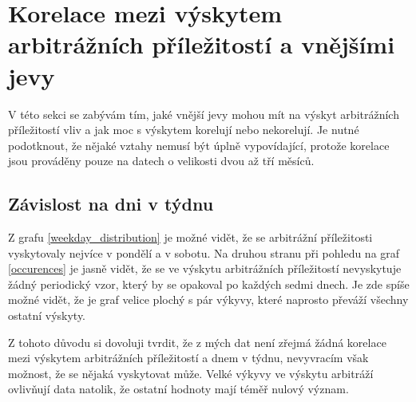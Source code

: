 \documentclass[thesis=B,czech]{FITthesis}[2019/03/21]
\begin{document}
\section{Korelace mezi výskytem arbitrážních příležitostí a vnějšími jevy}
V této sekci se zabývám tím, jaké vnější jevy mohou mít na výskyt arbitrážních příležitostí vliv a jak moc s výskytem korelují nebo nekorelují. Je nutné podotknout, že nějaké vztahy nemusí být úplně vypovídající, protože korelace jsou prováděny pouze na datech o velikosti dvou až tří měsíců.

\subsection{Závislost na dni v týdnu}
Z grafu \ref{weekday_distribution} je možné vidět, že se arbitrážní příležitosti vyskytovaly nejvíce v pondělí a v sobotu. Na druhou stranu při pohledu na graf \ref{occurences} je jasně vidět, že se ve výskytu arbitrážních příležitostí nevyskytuje žádný periodický vzor, který by se opakoval po každých sedmi dnech. Je zde spíše možné vidět, že je graf velice plochý s pár výkyvy, které naprosto převáží všechny ostatní výskyty.

 Z tohoto důvodu si dovoluji tvrdit, že z mých dat není zřejmá žádná korelace mezi výskytem arbitrážních příležitostí a dnem v týdnu, nevyvracím však možnost, že se nějaká vyskytovat může. Velké výkyvy ve výskytu arbitráží ovlivňují data natolik, že ostatní hodnoty mají téměř nulový význam.
\end{document}
